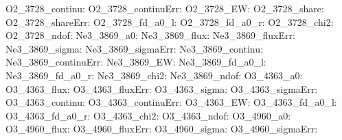 O2\_3728\_continu:  \newline 
O2\_3728\_continuErr:  \newline 
O2\_3728\_EW:  \newline 
O2\_3728\_share:  \newline 
O2\_3728\_shareErr:  \newline 
O2\_3728\_fd\_a0\_l:  \newline 
O2\_3728\_fd\_a0\_r:  \newline 
O2\_3728\_chi2:  \newline 
O2\_3728\_ndof:  \newline 
Ne3\_3869\_a0:  \newline 
Ne3\_3869\_flux:  \newline 
Ne3\_3869\_fluxErr:  \newline 
Ne3\_3869\_sigma:  \newline 
Ne3\_3869\_sigmaErr:  \newline 
Ne3\_3869\_continu:  \newline 
Ne3\_3869\_continuErr:  \newline 
Ne3\_3869\_EW:  \newline 
Ne3\_3869\_fd\_a0\_l:  \newline 
Ne3\_3869\_fd\_a0\_r:  \newline 
Ne3\_3869\_chi2:  \newline 
Ne3\_3869\_ndof:  \newline 
O3\_4363\_a0:  \newline 
O3\_4363\_flux:  \newline 
O3\_4363\_fluxErr:  \newline 
O3\_4363\_sigma:  \newline 
O3\_4363\_sigmaErr:  \newline 
O3\_4363\_continu:  \newline 
O3\_4363\_continuErr:  \newline 
O3\_4363\_EW:  \newline 
O3\_4363\_fd\_a0\_l:  \newline 
O3\_4363\_fd\_a0\_r:  \newline 
O3\_4363\_chi2:  \newline 
O3\_4363\_ndof:  \newline 
O3\_4960\_a0:  \newline 
O3\_4960\_flux:  \newline 
O3\_4960\_fluxErr:  \newline 
O3\_4960\_sigma:  \newline 
O3\_4960\_sigmaErr:  \newline 
